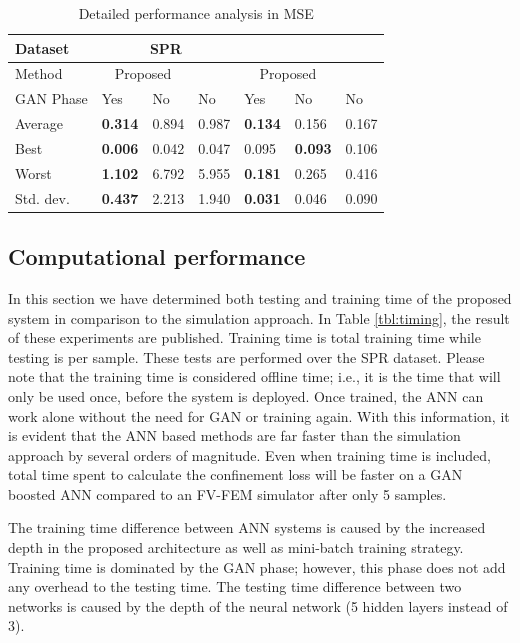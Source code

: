 \documentclass[journal]{IEEEtran}
\begin{document}
\begin{table}
	\caption{Detailed performance analysis in MSE}
	\centering
	\begin{tabular}{l|l|l|l|l|l|l}
		Dataset & \multicolumn{3}{c|}{SPR} & \multicolumn{3}{c}{\dszero{}} \\\hline
		Method & \multicolumn{2}{c|}{Proposed} & \cite{paper0}  & \multicolumn{2}{c|}{Proposed}   & \cite{paper0} \\\hline
		GAN Phase 			& Yes            & No    &  No     &   Yes            & No             & No    \\\hline
		Average   			& \textbf{0.314} & 0.894 & 0.987   &   \textbf{0.134} & 0.156          & 0.167 \\
		Best      			& \textbf{0.006} & 0.042 & 0.047   &   0.095          & \textbf{0.093} & 0.106 \\
		Worst     			& \textbf{1.102} & 6.792 & 5.955   &   \textbf{0.181} & 0.265          & 0.416 \\
		Std. dev.       	& \textbf{0.437} & 2.213 & 1.940   &   \textbf{0.031} & 0.046          & 0.090 \\
	\end{tabular}
	\label{tbl:all}
\end{table}


\subsection{Computational performance}

In this section we have determined both testing and training time of the proposed system in comparison to the simulation approach. In Table \ref{tbl:timing}, the result of these experiments are published. Training time is total training time while testing is per sample. These tests are performed over the SPR dataset. Please note that the training time is considered offline time; i.e., it is the time that will only be used once, before the system is deployed. Once trained, the ANN can work alone without the need for GAN or training again. With this information, it is evident that the ANN based methods are far faster than the simulation approach by several orders of magnitude. Even when training time is included, total time spent to calculate the confinement loss will be faster on a GAN boosted ANN compared to an FV-FEM simulator after only 5 samples.

The training time difference between ANN systems is caused by the increased depth in the proposed architecture as well as mini-batch training strategy. Training time is dominated by the GAN phase; however, this phase does not add any overhead to the testing time. The testing time difference between two networks is caused by the depth of the neural network (5 hidden layers instead of 3). 
\end{document}
